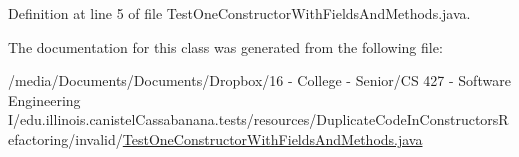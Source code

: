 Definition at line 5 of file TestOneConstructorWithFieldsAndMethods.java.



The documentation for this class was generated from the following file:\begin{DoxyCompactItemize}
\item 
/media/Documents/Documents/Dropbox/16 -\/ College -\/ Senior/CS 427 -\/ Software Engineering I/edu.illinois.canistelCassabanana.tests/resources/DuplicateCodeInConstructorsRefactoring/invalid/\hyperlink{TestOneConstructorWithFieldsAndMethods_8java}{TestOneConstructorWithFieldsAndMethods.java}\end{DoxyCompactItemize}
